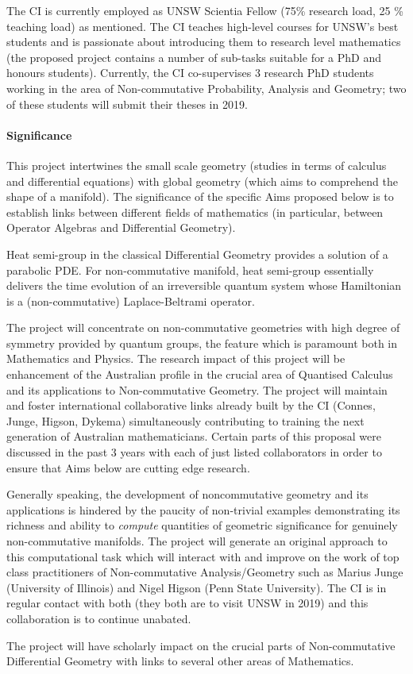 \documentclass[12pt]{article}
\newcommand{\archeading}[1]{\vspace{.3cm} \noindent{\bfseries #1} \vspace{.1cm}   }
\begin{document}
The CI is currently employed as UNSW Scientia Fellow (75\% research load, 25 \% teaching load) as mentioned. The CI teaches high-level courses for UNSW's best students and is passionate about introducing them to research level mathematics (the proposed project contains a number of sub-tasks suitable for a PhD and honours students). Currently, the CI co-supervises 3 research PhD students working in the area of Non-commutative Probability, Analysis and Geometry; two of these students will submit their theses in 2019.

\bigskip\archeading{Project quality and innovation}

\paragraph*{Significance} {\color{blue} This project intertwines the small scale geometry (studies in terms of calculus and differential equations) with global geometry (which aims to comprehend the shape of a manifold). The significance of the specific Aims proposed below is to establish links between different fields of mathematics (in particular, between Operator Algebras and Differential Geometry).

Heat semi-group in the classical Differential Geometry provides a solution of a parabolic PDE. For non-commutative manifold, heat semi-group essentially delivers the time evolution of an irreversible quantum system whose Hamiltonian is a (non-commutative) Laplace-Beltrami operator.

The project will concentrate on non-commutative geometries with high degree of symmetry provided by quantum groups, the feature which is paramount both in Mathematics and Physics. The research impact of this project will be enhancement of the Australian profile in the crucial area of Quantised Calculus and its applications to Non-commutative Geometry. The project will maintain and foster international collaborative links already built by the CI (Connes, Junge, Higson, Dykema) simultaneously contributing to training the next generation of Australian mathematicians. Certain parts of this proposal were discussed in the past 3 years with each of just listed collaborators in order to ensure that Aims below are cutting edge research.

Generally speaking, the development of noncommutative geometry and its applications is hindered by the paucity of non-trivial examples demonstrating its richness and ability to {\it compute} quantities of geometric significance for genuinely non-commutative manifolds. The project will generate an original approach to this computational task which will interact with and improve on the work of top class practitioners of Non-commutative Analysis/Geometry such as Marius Junge (University of Illinois) and Nigel Higson (Penn State University). The CI is in regular contact with both (they both are to visit UNSW in 2019) and this collaboration is to continue unabated.

The project will have scholarly impact on the crucial parts of Non-commutative Differential Geometry with links to several other areas of Mathematics. 
}
\end{document}
